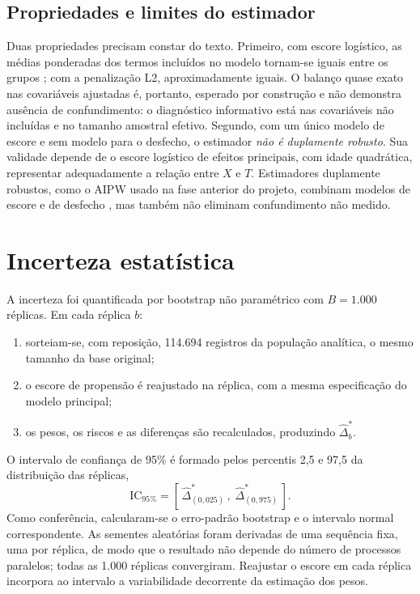 \documentclass[11pt,a4paper]{article}
\begin{document}
\subsection{Propriedades e limites do estimador}

Duas propriedades precisam constar do texto. Primeiro, com escore logístico, as médias
ponderadas dos termos incluídos no modelo tornam-se iguais entre os grupos \cite{li2018};
com a penalização L2, aproximadamente iguais. O balanço quase exato nas covariáveis
ajustadas é, portanto, esperado por construção e não demonstra ausência de confundimento:
o diagnóstico informativo está nas covariáveis não incluídas e no tamanho amostral
efetivo. Segundo, com um único modelo de escore e sem modelo para o desfecho, o estimador
\emph{não é duplamente robusto}. Sua validade depende de o escore logístico de efeitos
principais, com idade quadrática, representar adequadamente a relação entre $X$ e $T$.
Estimadores duplamente robustos, como o AIPW usado na fase anterior do projeto, combinam
modelos de escore e de desfecho \cite{funk2011}, mas também não eliminam confundimento
não medido.

\section{Incerteza estatística}\label{sec:incerteza}

A incerteza foi quantificada por bootstrap não paramétrico com $B = 1.000$ réplicas. Em
cada réplica $b$:
\begin{enumerate}
\item sorteiam-se, com reposição, 114.694 registros da população analítica, o mesmo
tamanho da base original;
\item o escore de propensão é reajustado na réplica, com a mesma especificação do modelo
principal;
\item os pesos, os riscos e as diferenças são recalculados, produzindo
$\hat{\Delta}^{*}_{b}$.
\end{enumerate}
O intervalo de confiança de 95\% é formado pelos percentis 2,5 e 97,5 da distribuição das
réplicas,
\begin{equation}\label{eq:ic}
\mathrm{IC}_{95\%} = \left[\, \hat{\Delta}^{*}_{(0{,}025)}\,,\; \hat{\Delta}^{*}_{(0{,}975)} \,\right].
\end{equation}
Como conferência, calcularam-se o erro-padrão bootstrap e o intervalo normal
correspondente. As sementes aleatórias foram derivadas de uma sequência fixa, uma por
réplica, de modo que o resultado não depende do número de processos paralelos; todas as
1.000 réplicas convergiram. Reajustar o escore em cada réplica incorpora ao intervalo a
variabilidade decorrente da estimação dos pesos.
\end{document}
